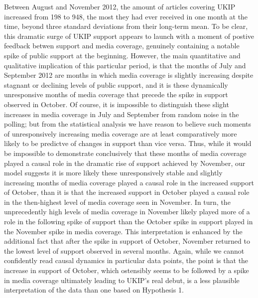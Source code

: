 \documentclass[12pt,article]{article}
\begin{document}
Between August and November 2012, the amount of articles covering UKIP
increased from 198 to 948, the most they had ever received in one month
at the time, beyond three standard deviations from their long-term mean.
To be clear, this dramatic surge of UKIP support appears to launch with
a moment of postive feedback betwen support and media coverage,
genuinely containing a notable spike of public support at the beginning.
However, the main quantitative and qualitative implication of this
particular period, is that the months of July and September 2012 are
months in which media coverage is slightly increasing despite stagnant
or declining levels of public support, and it is these dynamically
unresponsive months of media coverage that precede the spike in support
observed in October. Of course, it is impossible to distinguish these
slight increases in media coverage in July and September from random
noise in the polling; but from the statistical analysis we have reason
to believe such moments of unresponsively increasing media coverage are
at least comparatively more likely to be predictve of changes in support
than vice versa. Thus, while it would be impossible to demonstrate
conclusively that these months of media coverage played a causal role in
the dramatic rise of support achieved by November, our model suggests it
is more likely these unresponsively stable and slightly increasing
months of media coverage played a causal role in the increased support
of October, than it is that the increased support in October played a
causal role in the then-highest level of media coverage seen in
November. In turn, the unprecedently high levels of media coverage in
November likely played more of a role in the following spike of support
than the October spike in support played in the November spike in media
coverage. This interpretation is enhanced by the additional fact that
after the spike in support of October, November returned to the lowest
level of support observed in several months. Again, while we cannot
confidently read causal dynamics in particular data points, the point is
that the increase in support of October, which ostensibly seems to be
followed by a spike in media coverage ultimately leading to UKIP's real
debut, is a less plausible interpretation of the data than one based on
Hypothesis 1.
\end{document}
